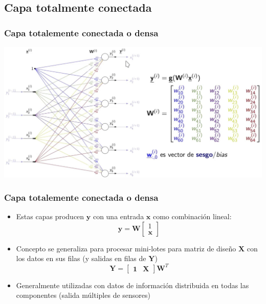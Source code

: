 \documentclass[svgnames,12pt,aspectratio=149]{beamer}
\begin{document}
\subsection{Capa totalmente conectada}
\begin{frame}
  \frametitle{Capa totalemente conectada o densa}
  \includegraphics[width= \textwidth]{im2}
  
\end{frame}
\begin{frame}
  \frametitle{Capa totalemente conectada o densa}
\begin{itemize}
\item Estas capas producen $\boldsymbol{y}$ con una entrada $\boldsymbol{x}$ como combinación lineal:
\begin{equation*}
\boldsymbol{y}=\boldsymbol{W} \begin{bmatrix} 1 \\ \boldsymbol{x} \end{bmatrix}
\end{equation*}
\item Concepto se generaliza para procesar mini-lotes para matriz de diseño $\boldsymbol{X}$ con los datos en sus filas (y salidas en filas de $\boldsymbol{Y} $) 
\begin{equation*}
\boldsymbol{Y}= \begin{bmatrix} \textbf{1} & \boldsymbol{X} \end{bmatrix} \boldsymbol{W}^T
\end{equation*}
\item Generalmente utilizadas con datos de información distribuida en todas las componentes (salida múltiples de sensores) 
\end{itemize}
  
\end{frame}
\end{document}
